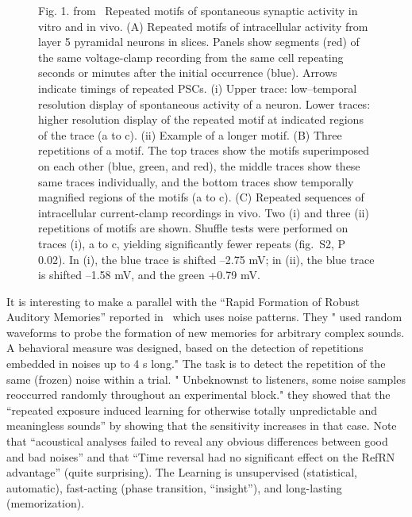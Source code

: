 \documentclass[brainsci, %
               review,submit,pdftex,moreauthors%
               ]{Definitions/mdpi}
\begin{document}
\begin{figure}
\centering
\caption{Fig. 1. from~\citep{ikegaya_synfire_2004} Repeated motifs of spontaneous synaptic activity in vitro and in vivo. (A) Repeated motifs of intracellular activity from layer 5 pyramidal neurons in slices. Panels show segments (red) of the same voltage-clamp recording from the same cell repeating seconds or minutes after the initial occurrence (blue). Arrows indicate timings of repeated PSCs. (i) Upper trace: low--temporal resolution display of spontaneous activity of a neuron. Lower traces: higher resolution display of the repeated motif at indicated regions of the trace (a to c). (ii) Example of a longer motif. (B) Three repetitions of a motif. The top traces show the motifs superimposed on each other (blue, green, and red), the middle traces show these same traces individually, and the bottom traces show temporally magnified regions of the motifs (a to c). (C) Repeated sequences of intracellular current-clamp recordings in vivo. Two (i) and three (ii) repetitions of motifs are shown. Shuffle tests were performed on traces (i), a to c, yielding significantly fewer repeats (fig.~S2, P  0.02). In (i), the blue trace is shifted --2.75 mV; in (ii), the blue trace is shifted --1.58 mV, and the green +0.79 mV.}\label{fig:Ikegaya2004}
\end{figure}

It is interesting to make a parallel with the ``Rapid Formation of Robust Auditory Memories'' reported in~\citep{agus_rapid_2010} which uses noise patterns. They " used random waveforms to probe the formation of new memories for arbitrary complex sounds. A behavioral measure was designed, based on the detection of repetitions embedded in noises up to 4 s long." The task is to detect the repetition of the same (frozen) noise within a trial. " Unbeknownst to listeners, some noise samples reoccurred randomly throughout an experimental block." they showed that the ``repeated exposure induced learning for otherwise totally unpredictable and meaningless sounds'' by showing that the sensitivity increases in that case. Note that ``acoustical analyses failed to reveal any obvious differences between good and bad noises'' and that ``Time reversal had no significant effect on the RefRN advantage'' (quite surprising). The Learning is unsupervised (statistical, automatic), fast-acting (phase transition, ``insight''), and long-lasting (memorization).
\end{document}
